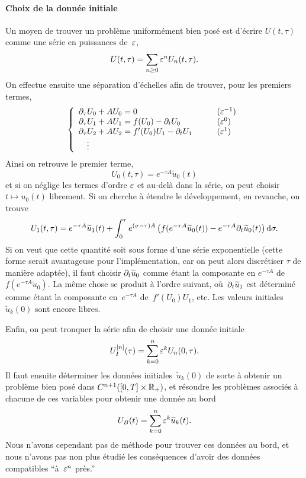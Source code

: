 \paragraph{Choix de la donnée initiale\\}
Un moyen de trouver un problème uniformément bien posé est d'écrire $U(t,\tau)$ comme une série en puissances de~$\varepsilon$, 
\begin{equation*}
    U(t,\tau) = \sum_{n \geq 0} \varepsilon^n U_n (t,\tau) .
\end{equation*}
On effectue ensuite une séparation d'échelles afin de trouver, pour les premiers termes, 
\begin{equation*}
    \left\{\begin{array}{ll}
        \partial_\tau U_0 + A U_0 = 0 & (\varepsilon^{-1}) \\
        \partial_\tau U_1 + AU_1 = f(U_0) - \partial_t U_0 
        & (\varepsilon^0) \\
        \partial_\tau U_2 + AU_2 = f'(U_0)U_1 - \partial_t U_1
        \qquad
        & (\varepsilon^1) \\
        \quad\vdots
    \end{array}\right.
\end{equation*}
Ainsi on retrouve le premier terme,
\begin{equation*}
    U_0(t,\tau) = e^{-\tau A} \widetilde{u}_0(t)
\end{equation*}
et si on néglige les termes d'ordre $\varepsilon$ et au-delà dans la série, on peut choisir $t \mapsto u_0(t)$ librement. Si on cherche à étendre le développement, en revanche, on trouve 
\begin{equation*}
    U_1(t,\tau) = e^{-\tau A} \widetilde{u}_1(t)
    + \int_0^{\tau} e^{(\sigma-\tau)A} \left(
        f(e^{-\tau A}\widetilde{u}_0(t)) - e^{-\tau A} \partial_t \widetilde{u}_0(t) 
    \right) \mathrm{d} \sigma .
\end{equation*}
Si on veut que cette quantité soit sous forme d'une série exponentielle (cette forme serait avantageuse pour l'implémentation, car on peut alors discrétiser $\tau$ de manière adaptée), il faut choisir $\partial_t \widetilde{u}_0$ comme étant la composante en $e^{-\tau A}$ de $f(e^{-\tau A}\widetilde{u}_0)$. La même chose se produit à l'ordre suivant, où~$\partial_t \widetilde{u}_1$ est déterminé comme étant la composante en~$e^{-\tau A}$ de~$f'(U_0)U_1$, etc. Les valeurs initiales~$\widetilde{u}_k(0)$ sont encore libres.

Enfin, on peut tronquer la série afin de choisir une donnée initiale 
\begin{equation*}
    U_I^{[n]}(\tau) = \sum_{k=0}^n \varepsilon^k U_n(0,\tau) .
\end{equation*}
Il faut ensuite déterminer les données initiales~$\widetilde{u}_k(0)$ de sorte à obtenir un problème bien posé dans $C^{n+1}([0,T] \times \mathbb{R}_+)$, et résoudre les problèmes associés à chacune de ces variables pour obtenir une donnée au bord 
\begin{equation*}
    U_B(t) = \sum_{k = 0}^n \varepsilon^k \widetilde{u}_k(t) .
\end{equation*}
Nous n'avons cependant pas de méthode pour trouver ces données au bord, et nous n'avons pas non plus étudié les conséquences d'avoir des données compatibles \enquote{à~$\varepsilon^{n}$ près.}

